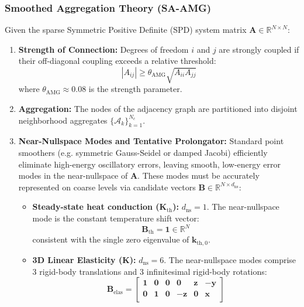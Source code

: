 \documentclass[11pt, a4paper]{article}
\begin{document}
\subsubsection{Smoothed Aggregation Theory (SA-AMG)}
Given the sparse Symmetric Positive Definite (SPD) system matrix $\mathbf{A} \in \mathbb{R}^{N \times N}$:
\begin{enumerate}
    \item \textbf{Strength of Connection:} Degrees of freedom $i$ and $j$ are strongly coupled if their off-diagonal coupling exceeds a relative threshold:
    \begin{equation}
    |A_{ij}| \ge \theta_{\text{AMG}} \sqrt{A_{ii} A_{jj}}
    \end{equation}
    where $\theta_{\text{AMG}} \approx 0.08$ is the strength parameter.
    \item \textbf{Aggregation:} The nodes of the adjacency graph are partitioned into disjoint neighborhood aggregates $\{\mathcal{A}_k\}_{k=1}^{N_c}$.
    \item \textbf{Near-Nullspace Modes and Tentative Prolongator:} Standard point smoothers (e.g. symmetric Gauss-Seidel or damped Jacobi) efficiently eliminate high-energy oscillatory errors, leaving smooth, low-energy error modes in the near-nullspace of $\mathbf{A}$. These modes must be accurately represented on coarse levels via candidate vectors $\mathbf{B} \in \mathbb{R}^{N \times d_{\text{ns}}}$:
    \begin{itemize}
        \item \textbf{Steady-state heat conduction ($\mathbf{K}_{\text{th}}$):} $d_{\text{ns}} = 1$. The near-nullspace mode is the constant temperature shift vector:
        \begin{equation}
        \mathbf{B}_{\text{th}} = \mathbf{1} \in \mathbb{R}^N
        \end{equation}
        consistent with the single zero eigenvalue of $\mathbf{k}_{\text{th}, 0}$.
        \item \textbf{3D Linear Elasticity ($\mathbf{K}$):} $d_{\text{ns}} = 6$. The near-nullspace modes comprise 3 rigid-body translations and 3 infinitesimal rigid-body rotations:
        \begin{equation}
        \mathbf{B}_{\text{elas}} = \begin{bmatrix}
        \mathbf{1} & \mathbf{0} & \mathbf{0} & \mathbf{0} & \mathbf{z} & -\mathbf{y} \\
        \mathbf{0} & \mathbf{1} & \mathbf{0} & -\mathbf{z} & \mathbf{0} & \mathbf{x} \\

\end{bmatrix}
\end{equation}
\end{itemize}
\end{enumerate}
\end{document}
